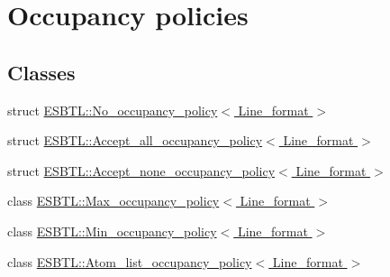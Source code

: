 \hypertarget{group__occpol}{}\section{Occupancy policies}
\label{group__occpol}
\subsection*{Classes}
\begin{DoxyCompactItemize}
\item 
struct \hyperlink{structESBTL_1_1No__occupancy__policy}{E\+S\+B\+T\+L\+::\+No\+\_\+occupancy\+\_\+policy$<$ Line\+\_\+format $>$}
\item 
struct \hyperlink{structESBTL_1_1Accept__all__occupancy__policy}{E\+S\+B\+T\+L\+::\+Accept\+\_\+all\+\_\+occupancy\+\_\+policy$<$ Line\+\_\+format $>$}
\item 
struct \hyperlink{structESBTL_1_1Accept__none__occupancy__policy}{E\+S\+B\+T\+L\+::\+Accept\+\_\+none\+\_\+occupancy\+\_\+policy$<$ Line\+\_\+format $>$}
\item 
class \hyperlink{classESBTL_1_1Max__occupancy__policy}{E\+S\+B\+T\+L\+::\+Max\+\_\+occupancy\+\_\+policy$<$ Line\+\_\+format $>$}
\item 
class \hyperlink{classESBTL_1_1Min__occupancy__policy}{E\+S\+B\+T\+L\+::\+Min\+\_\+occupancy\+\_\+policy$<$ Line\+\_\+format $>$}
\item 
class \hyperlink{classESBTL_1_1Atom__list__occupancy__policy}{E\+S\+B\+T\+L\+::\+Atom\+\_\+list\+\_\+occupancy\+\_\+policy$<$ Line\+\_\+format $>$}
\end{DoxyCompactItemize}


